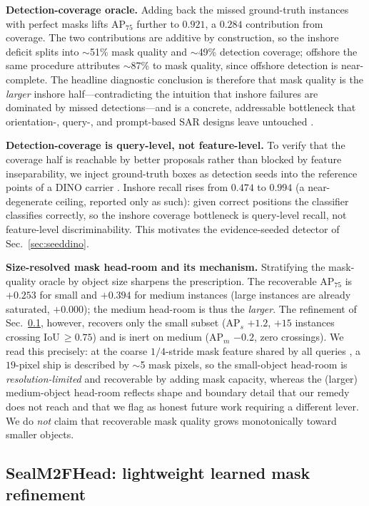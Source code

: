 \documentclass[journal]{IEEEtran}
\begin{document}
\textbf{Detection-coverage oracle.} Adding back the missed ground-truth instances with perfect masks lifts AP$_{75}$ further to $0.921$, a $0.284$ contribution from coverage. The two contributions are additive by construction, so the inshore deficit splits into $\sim$51\% mask quality and $\sim$49\% detection coverage; offshore the same procedure attributes $\sim$87\% to mask quality, since offshore detection is near-complete. The headline diagnostic conclusion is therefore that mask quality is the \emph{larger} inshore half---contradicting the intuition that inshore failures are dominated by missed detections---and is a concrete, addressable bottleneck that orientation-, query-, and prompt-based SAR designs leave untouched \cite{gao2025o2former,xu2025diffsarshipinst,zheng2024mcsamseg}.

\textbf{Detection-coverage is query-level, not feature-level.} To verify that the coverage half is reachable by better proposals rather than blocked by feature inseparability, we inject ground-truth boxes as detection seeds into the reference points of a DINO carrier \cite{zhang2023dino}. Inshore recall rises from $0.474$ to $0.994$ (a near-degenerate ceiling, reported only as such): given correct positions the classifier classifies correctly, so the inshore coverage bottleneck is query-level recall, not feature-level discriminability. This motivates the evidence-seeded detector of Sec.~\ref{sec:seeddino}.

\textbf{Size-resolved mask head-room and its mechanism.} Stratifying the mask-quality oracle by object size sharpens the prescription. The recoverable AP$_{75}$ is $+0.253$ for small and $+0.394$ for medium instances (large instances are already saturated, $+0.000$); the medium head-room is thus the \emph{larger}. The refinement of Sec.~\ref{sec:sealm2f}, however, recovers only the small subset (AP$_s$ $+1.2$, $+15$ instances crossing IoU$\,\ge\!0.75$) and is inert on medium (AP$_m$ $-0.2$, zero crossings). We read this precisely: at the coarse $1/4$-stride mask feature shared by all queries \cite{cheng2022mask2former}, a $19$-pixel ship is described by $\sim$5 mask pixels, so the small-object head-room is \emph{resolution-limited} and recoverable by adding mask capacity, whereas the (larger) medium-object head-room reflects shape and boundary detail that our remedy does not reach and that we flag as honest future work requiring a different lever. We do \emph{not} claim that recoverable mask quality grows monotonically toward smaller objects.

\subsection{SealM2FHead: lightweight learned mask refinement}
\label{sec:sealm2f}
\end{document}
